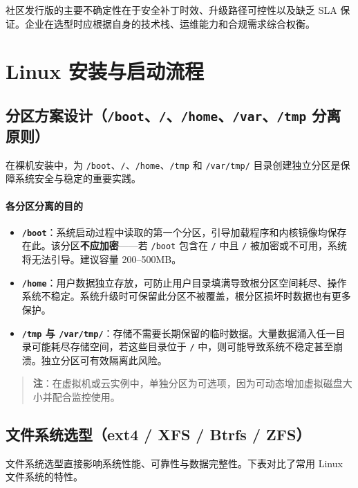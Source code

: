 \documentclass[12pt,UTF8]{ctexbook}
\begin{document}
社区发行版的主要不确定性在于安全补丁时效、升级路径可控性以及缺乏 SLA 保证。企业在选型时应根据自身的技术栈、运维能力和合规需求综合权衡。

\section{Linux 安装与启动流程}

\subsection{分区方案设计（\texttt{/boot}、\texttt{/}、\texttt{/home}、\texttt{/var}、\texttt{/tmp} 分离原则）}

在裸机安装中，为 \texttt{/boot}、\texttt{/}、\texttt{/home}、\texttt{/tmp} 和 \texttt{/var/tmp/} 目录创建独立分区是保障系统安全与稳定的重要实践。

\paragraph{各分区分离的目的}

\begin{itemize}
\item \textbf{\texttt{/boot}}：系统启动过程中读取的第一个分区，引导加载程序和内核镜像均保存在此。该分区\textbf{不应加密}——若 \texttt{/boot} 包含在 \texttt{/} 中且 \texttt{/} 被加密或不可用，系统将无法引导。建议容量 200--500MB。
\item \textbf{\texttt{/home}}：用户数据独立存放，可防止用户目录填满导致根分区空间耗尽、操作系统不稳定。系统升级时可保留此分区不被覆盖，根分区损坏时数据也有更多保护。
\item \textbf{\texttt{/tmp} 与 \texttt{/var/tmp/}}：存储不需要长期保留的临时数据。大量数据涌入任一目录可能耗尽存储空间，若这些目录位于 \texttt{/} 中，则可能导致系统不稳定甚至崩溃。独立分区可有效隔离此风险。
\end{itemize}

\begin{quote}
\small \textbf{注}：在虚拟机或云实例中，单独分区为可选项，因为可动态增加虚拟磁盘大小并配合监控使用。
\end{quote}

\subsection{文件系统选型（ext4 / XFS / Btrfs / ZFS）}

文件系统选型直接影响系统性能、可靠性与数据完整性。下表对比了常用 Linux 文件系统的特性。
\end{document}
